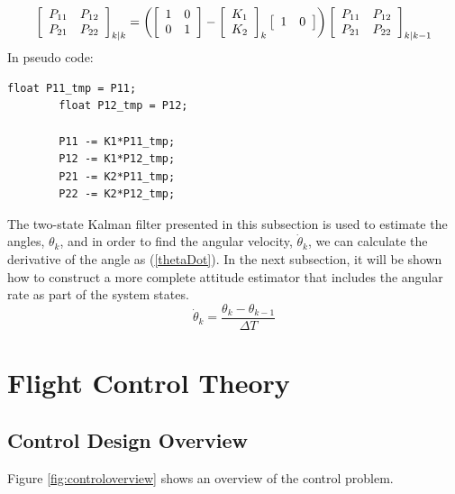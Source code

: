\documentclass[a4paper]{report}
\begin{document}
		\begin{equation}
		\left[
		\begin{array}{c c}
		P_{11}	&	P_{12}\\
		P_{21}	&	P_{22}
		\end{array} \right]_{k|k}
		=
		\left(
		\left[
		\begin{array}{c c}
		1	&	0\\
		0	&	1
		\end{array} \right]
		-
		\left[
		\begin{array}{c}
		K_{1}\\
		K_{2}
		\end{array} \right]_{k}
		\left[
		\begin{array}{c c}
		1	&	0
		\end{array} \right]
		\right)
		\left[
		\begin{array}{c c}
		P_{11}	&	P_{12}\\
		P_{21}	&	P_{22}
		\end{array} \right]_{k|k-1}
		\end{equation}
    In pseudo code:
		\begin{lstlisting}[frame=single]
		float P11_tmp = P11;
		float P12_tmp = P12;

		P11 -= K1*P11_tmp;
		P12 -= K1*P12_tmp;
		P21 -= K2*P11_tmp;
		P22 -= K2*P12_tmp;
		\end{lstlisting}

	The two-state Kalman filter presented in this subsection is used to estimate the angles, $\theta_{k}$, and in order to find the angular velocity, $\dot{\theta}_{k}$, we can calculate the derivative of the angle as (\ref{thetaDot}). In the next subsection, it will be shown how to construct a more complete attitude estimator that includes the angular rate as part of the system states. 
	\begin{equation}
	\label{thetaDot}
	\dot{\theta}_{k}=\frac{\theta_{k}-\theta_{k-1}}{\Delta T}
	\end{equation}

\chapter{Flight Control Theory}

	\section{Control Design Overview}

Figure \ref{fig:controloverview} shows an overview of the control problem.
\end{document}
